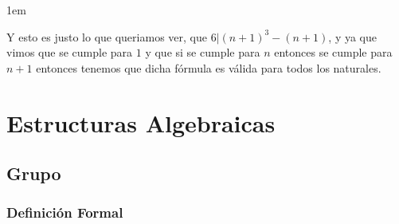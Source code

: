 \documentclass[12pt, fleqn]{report}                             %
\newenvironment{SmallIndentation}[1][0.75em]                    %
        {\begin{adjustwidth}{#1}{}\begin{footnotesize}}             %
        {\end{footnotesize}\end{adjustwidth}}                       %
\theoremstyle{break}                                            %
\begin{document}
\begin{SmallIndentation}[1em]
\begin{itemize}
                        Y esto es justo lo que queriamos ver, que $6 | (n+1)^3 -(n+1)$, y ya que vimos que se cumple
                        para $1$ y que si se cumple para $n$ entonces se cumple para $n+1$ entonces
                        tenemos que dicha fórmula es válida para todos los naturales.
                        
                    \end{itemize}

                \end{SmallIndentation}





































    \chapter{Estructuras Algebraicas}
        \clearpage


        \clearpage
        \section{Grupo}

            \subsection{Definición Formal}
\end{document}
